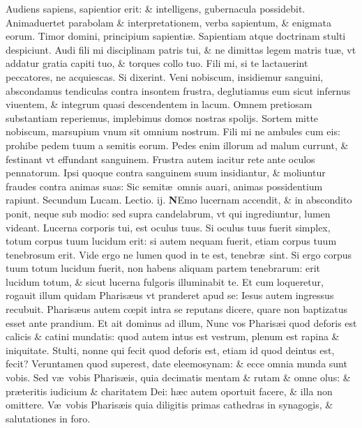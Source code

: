 \documentclass[a5paper,10pt]{book}
\def\rightmarginnote{%
	\lrmarginnote{\hskip\columnwidth \hskip -1em}}
\def\ae{æ}
\def\oe{œ}
\begin{document}
\begin{multicols*}{2}
Audiens sapiens, sapientior erit: \& intelligens, gubernacula possidebit.
Animaduertet parabolam \& interpretationem, verba sapientum, \& enigmata eorum. Timor domini, principium sapienti\ae . Sapientiam atque doctrinam stulti despiciunt.
Audi fili mi disciplinam patris tui, \& ne dimittas legem matris tu\ae , vt addatur gratia capiti tuo, \& torques collo tuo.
Fili mi, si te lactauerint peccatores, ne acquiescas.
Si dixerint. Veni nobiscum, insidiemur sanguini, abscondamus tendiculas contra insontem frustra, deglutiamus eum sicut infernus viuentem, \& integrum quasi descendentem in lacum.
Omnem pretiosam substantiam reperiemus, implebimus domos nostras spolijs.
Sortem mitte nobiscum, marsupium vnum sit omnium nostrum. Fili mi ne ambules cum eis: prohibe pedem tuum a semitis eorum.
Pedes enim illorum ad malum currunt, \& festinant vt effundant sanguinem.
Frustra autem iacitur rete ante oculos pennatorum.
Ipsi quoque contra sanguinem suum insidiantur,
\& moliuntur fraudes contra animas suas: Sic semit\ae \ omnis auari, animas possidentium rapiunt.
\newline \color{red} Secundum Lucam. \hfill Lectio. ij. \color{black}
\vspace{-1.25em}
\lettrine[lines=2]{\bfseries \color{red} N}{}Emo\rightmarginnote{c. 11.} lucernam accendit, \& in abscondito ponit, neque sub modio: sed supra candelabrum, vt qui ingrediuntur, lumen videant.
Lucerna corporis tui, est oculus tuus. Si oculus tuus fuerit simplex, totum corpus tuum lucidum erit: si autem nequam fuerit, etiam corpus tuum tenebrosum erit. Vide ergo ne lumen quod in te est, tenebr\ae \ sint.
Si ergo corpus tuum totum lucidum fuerit, non habens aliquam partem tenebrarum: erit lucidum totum, \& sicut lucerna fulgoris illuminabit te.
Et cum loqueretur, rogauit illum quidam Pharis\ae us vt pranderet apud se: Iesus autem ingressus recubuit.
Pharis\ae us autem c\oe pit intra se reputans dicere, quare non baptizatus esset ante prandium.
Et ait dominus ad illum, Nunc vos Pharis\ae i quod deforis est calicis \& catini mundatis: quod autem intus est vestrum, plenum est rapina \& iniquitate.
Stulti, nonne qui fecit quod deforis est, etiam id quod deintus est, fecit? Veruntamen quod superest, date eleemosynam: \& ecce omnia munda sunt vobis.
Sed v\ae \ vobis Pharis\ae is, quia decimatis mentam \& rutam \& omne olus: \& pr\ae teritis iudicium \& charitatem Dei: h\ae c autem oportuit facere, \& illa non omittere.
V\ae \ vobis Pharis\ae is quia diligitis primas cathedras in synagogis, \& salutationes in foro.

\end{multicols*}
\end{document}
